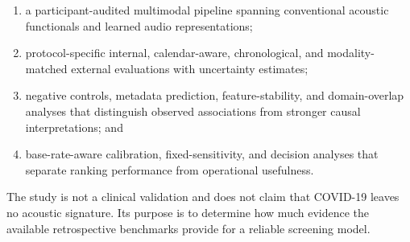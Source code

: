 \begin{enumerate}
    \item a participant-audited multimodal pipeline spanning conventional
    acoustic functionals and learned audio representations;
    \item protocol-specific internal, calendar-aware, chronological, and
    modality-matched external evaluations with uncertainty estimates;
    \item negative controls, metadata prediction, feature-stability, and
    domain-overlap analyses that distinguish observed associations from
    stronger causal interpretations; and
    \item base-rate-aware calibration, fixed-sensitivity, and decision analyses
    that separate ranking performance from operational usefulness.
\end{enumerate}

The study is not a clinical validation and does not claim that COVID-19 leaves
no acoustic signature. Its purpose is to determine how much evidence the
available retrospective benchmarks provide for a reliable screening model.
